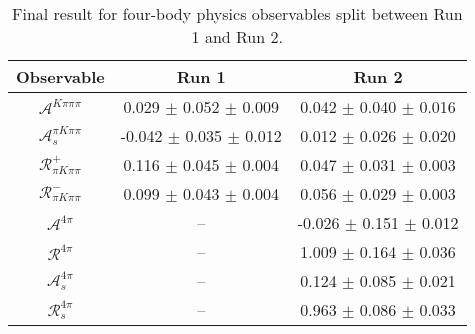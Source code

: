 \begin{table}
\centering
\begin{tabular}{ccc}
Observable & Run 1 & Run 2\\
\midrule
$\mathcal{A}^{K\pi\pi\pi}$ & 0.029 $\pm$ 0.052 $\pm$ 0.009 & 0.042 $\pm$ 0.040 $\pm$ 0.016 \\
$\mathcal{A}_s^{\pi K\pi\pi}$ & -0.042 $\pm$ 0.035 $\pm$ 0.012 & 0.012 $\pm$ 0.026 $\pm$ 0.020 \\
$\mathcal{R}_{\pi K\pi\pi}^+$ & 0.116 $\pm$ 0.045 $\pm$ 0.004 & 0.047 $\pm$ 0.031 $\pm$ 0.003 \\
$\mathcal{R}_{\pi K\pi\pi}^-$ & 0.099 $\pm$ 0.043 $\pm$ 0.004 & 0.056 $\pm$ 0.029 $\pm$ 0.003 \\
$\mathcal{A}^{4\pi}$ & -- & -0.026 $\pm$ 0.151 $\pm$ 0.012 \\
$\mathcal{R}^{4\pi}$ & -- & 1.009 $\pm$ 0.164 $\pm$ 0.036 \\
$\mathcal{A}_s^{4\pi}$ & -- & 0.124 $\pm$ 0.085 $\pm$ 0.021 \\
$\mathcal{R}_{s}^{4\pi}$ & -- & 0.963 $\pm$ 0.086 $\pm$ 0.033 \\
\end{tabular}
\caption{Final result for four-body physics observables split between Run 1 and Run 2.}
\label{tab:results_splitObs_fourBody}
\end{table}

